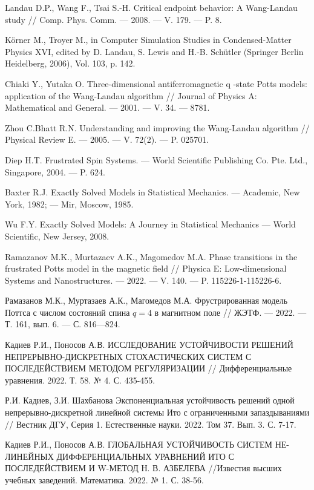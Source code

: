 \begin{thebibliography}{111}
Landau D.P., Wang F., Tsai S.-H.
Critical endpoint behavior: A Wang-Landau study
//
Comp. Phys. Comm.
--- 2008.
--- V. 179.
--- P. 8.

Körner M., Troyer M., in Computer Simulation Studies in Condensed-Matter Physics XVI, edited by D. Landau, S. Lewis and H.-B. Schütler (Springer Berlin Heidelberg, 2006), Vol. 103, p. 142.

Chiaki Y., Yutaka O.
Three-dimensional antiferromagnetic q -state Potts models: application of the Wang-Landau algorithm
//
Journal of Physics A: Mathematical and General.
--- 2001.
--- V. 34.
--- 8781.

Zhou C.Bhatt R.N.
Understanding and improving the Wang-Landau algorithm
//
Physical Review E.
--- 2005.
--- V. 72(2).
--- P. 025701.



Diep H.T.
Frustrated Spin Systems.
--- World Scientific Publishing Co. Pte. Ltd., Singapore, 2004.
--- P. 624.

Baxter R.J.
Exactly Solved Models in Statistical Mechanics.
--- Academic, New York, 1982;
--- Mir, Moscow, 1985.

Wu F.Y.
Exactly Solved Models: A Journey in Statistical Mechanics
--- World Scientific, New Jersey, 2008.

Ramazanov M.K., Murtazaev A.K., Magomedov M.A.
Phase transitions in the frustrated Potts model in the magnetic field
//
Physica E: Low-dimensional Systems and Nanostructures.
--- 2022.
--- V. 140.
--- P. 115226-1-115226-6.

Рамазанов М.К., Муртазаев А.К., Магомедов М.А.
Фрустрированная модель Поттса с числом состояний спина $q = 4$ в магнитном поле
//
ЖЭТФ.
--- 2022.
--- Т. 161, вып. 6.
--- С. 816---824.

 Кадиев Р.И., Поносов А.В. ИССЛЕДОВАНИЕ УСТОЙЧИВОСТИ РЕШЕНИЙ
НЕПРЕРЫВНО-ДИСКРЕТНЫХ СТОХАСТИЧЕСКИХ СИСТЕМ С ПОСЛЕДЕЙСТВИЕМ МЕТОДОМ
РЕГУЛЯРИЗАЦИИ // Дифференциальные уравнения. 2022. Т. 58. № 4. С.
435-455.

 Р.И. Кадиев, З.И. Шахбанова Экспоненциальная устойчивость решений
одной непрерывно-дискретной линейной системы Ито с ограниченными
запаздываниями // Вестник ДГУ, Серия 1. Естественные науки. 2022.
Том 37. Вып. 3. С. 7-17.

 Кадиев Р.И., Поносов А.В. ГЛОБАЛЬНАЯ УСТОЙЧИВОСТЬ СИСТЕМ
НЕ-ЛИНЕЙНЫХ ДИФФЕРЕНЦИАЛЬНЫХ УРАВНЕНИЙ ИТО С ПОСЛЕДЕЙСТВИЕМ И
W-МЕТОД Н. В. АЗБЕЛЕВА //Известия высших учебных заведений.
Математика. 2022. № 1. С. 38-56.


\end{thebibliography}
